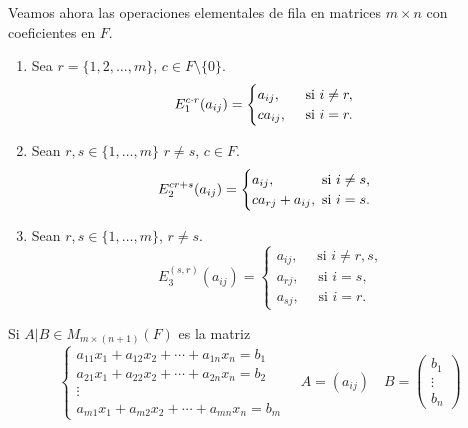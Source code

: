 \documentclass[12pt,a4paper]{book}
\begin{document}
    Veamos ahora las operaciones elementales de fila en matrices $m \times n$ con coeficientes en $F$.
    \begin{enumerate}
        \item Sea $r=\{1,2,\dots,m\}$, $c\in F\setminus\{0\}$.
        \begin{equation*}
            E_{1}^{c\cdot r}(a_{ij})=
            \begin{cases}
                a_{ij},\hfill\text{ si }i\neq r,\\
                ca_{ij},\quad\text{ si }i=r.
            \end{cases}
        \end{equation*} 
        \item Sean $r,s\in\{1,\dots,m\}$ $r\neq s$, $c\in F$.
        \begin{equation*}
            E_{2}^{cr+s}(a_{ij})=
            \begin{cases}
                a_{ij},\hfill\text{ si }i\neq s,\\
                ca_{rj}+a_{ij},\text{ si }i=s.
            \end{cases}
        \end{equation*}
        \item Sean $r,s\in\{1,\dots,m\}$, $r\neq s$.
        \begin{equation*}
            E_{3}^{(s,r)}(a_{ij})=
            \begin{cases}
                a_{ij},\quad\text{ si }i\neq r,s,\\
                a_{rj},\quad\text{ si }i=s,\\
                a_{sj},\quad\text{ si }i=r.
            \end{cases}
        \end{equation*}
    \end{enumerate}
    Si $A|B\in M_{m\times(n+1)}(F)$ es la matriz
    \begin{equation*}
        \begin{cases}
            a_{11}x_1 + a_{12}x_2 + \cdots + a_{1n}x_n = b_1 \\
            a_{21}x_1 + a_{22}x_2 + \cdots + a_{2n}x_n = b_2 \\
            \vdots \\
            a_{m1}x_1 + a_{m2}x_2 + \cdots + a_{mn}x_n = b_m
        \end{cases}
        \quad
        A=(a_{ij})
        \quad
        B=
        \begin{pmatrix}
            b_{1}\\
            \vdots\\
            b_{n}
        \end{pmatrix}
    \end{equation*}
\end{document}

